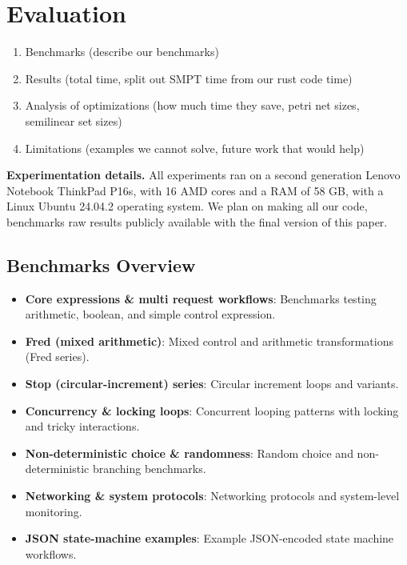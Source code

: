 \section{Evaluation}
\label{sec:evaluation}

\begin{enumerate}
    \item Benchmarks (describe our benchmarks)
    \item Results (total time, split out SMPT time from our rust code time)
    \item Analysis of optimizations (how much time they save, petri net sizes, semilinear set sizes)
    \item Limitations (examples we cannot solve, future work that would help)
\end{enumerate}


\noindent
\textbf{Experimentation details.}
All experiments ran on a second generation Lenovo Notebook ThinkPad P16s, with 16 AMD cores and a RAM of 58 GB, with a Linux Ubuntu 24.04.2 operating system.
%
We plan on making all our code, benchmarks raw results publicly available with the final version of this paper.
 


\subsection{Benchmarks Overview}
\label{subsec:benchmarks}

\begin{itemize}
	\item \textbf{Core expressions \& multi request workflows}: Benchmarks testing arithmetic, boolean, and simple control expression.
	\item \textbf{Fred (mixed arithmetic)}: Mixed control and arithmetic transformations (Fred series).
	\item \textbf{Stop (circular-increment) series}: Circular increment loops and variants.
	\item \textbf{Concurrency \& locking loops}: Concurrent looping patterns with locking and tricky interactions.
	\item \textbf{Non-deterministic choice \& randomness}: Random choice and non-deterministic branching benchmarks.
	\item \textbf{Networking \& system protocols}: Networking protocols and system-level monitoring.
	\item \textbf{JSON state-machine examples}: Example JSON-encoded state machine workflows.
\end{itemize}



